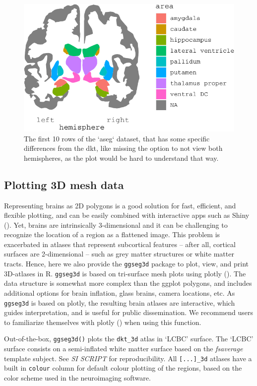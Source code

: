 \documentclass[fleqn,10pt]{wlpeerj} %
\begin{document}
\begin{figure}
\includegraphics[width=0.6\linewidth]{draft_2_files/figure-latex/atlases-1} \caption{The first 10 rows of the `aseg` dataset, that has some specific differences from the dkt, like missing the option to not view both hemispheres, as the plot would be hard to understand that way.}\label{fig:atlases}
\end{figure}

\hypertarget{plotting-3d-mesh-data}{%
\subsection{Plotting 3D mesh data}\label{plotting-3d-mesh-data}}

Representing brains as 2D polygons is a good solution for fast, efficient, and flexible plotting, and can be easily combined with interactive apps such as Shiny (\citet{shiny}).
Yet, brains are intrinsically 3-dimensional and it can be challenging to recognize the location of a region as a flattened image.
This problem is exacerbated in atlases that represent subcortical features -- after all, cortical surfaces are 2-dimensional -- such as grey matter structures or white matter tracts.
Hence, here we also provide the \texttt{ggseg3d} package to plot, view, and print 3D-atlases in R.
\texttt{ggseg3d} is based on tri-surface mesh plots using plotly (\citet{plotly}).
The data structure is somewhat more complex than the ggplot polygons, and includes additional options for brain inflation, glass brains, camera locations, etc.
As \texttt{ggseg3d} is based on plotly, the resulting brain atlases are interactive, which guides interpretation, and is useful for public dissemination.
We recommend users to familiarize themselves with plotly (\citet{plotly}) when using this function.

Out-of-the-box, \texttt{ggseg3d()} plots the \texttt{dkt\_3d} atlas in `LCBC' surface.
The `LCBC' surface consists on a semi-inflated white matter surface based on the \emph{fsaverage} template subject.
See \emph{SI SCRIPT} for reproducibility.
All \texttt{{[}...{]}\_3d} atlases have a built in \texttt{colour} column for default colour plotting of the regions, based on the color scheme used in the neuroimaging software.
\end{document}

